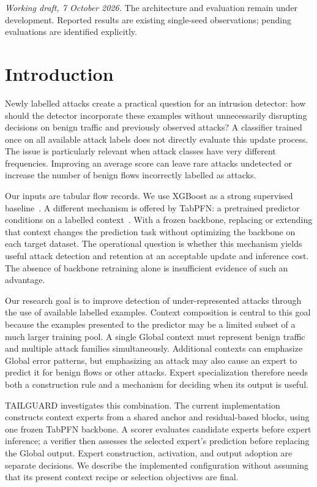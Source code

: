 \documentclass[sigconf,anonymous,pbalance]{acmart}
\begin{document}
\noindent\textit{Working draft, 7 October 2026.} The architecture and evaluation remain under development. Reported results are existing single-seed observations; pending evaluations are identified explicitly.

\section{Introduction}
\label{sec:intro}
Newly labelled attacks create a practical question for an intrusion detector: how should the detector incorporate these examples without unnecessarily disrupting decisions on benign traffic and previously observed attacks? A classifier trained once on all available attack labels does not directly evaluate this update process. The issue is particularly relevant when attack classes have very different frequencies. Improving an average score can leave rare attacks undetected or increase the number of benign flows incorrectly labelled as attacks.

Our inputs are tabular flow records. We use XGBoost as a strong supervised baseline~\cite{chen2016xgboost}. A different mechanism is offered by TabPFN: a pretrained predictor conditions on a labelled context~\cite{hollmann2023tabpfn,hollmann2025tabpfn}. With a frozen backbone, replacing or extending that context changes the prediction task without optimizing the backbone on each target dataset. The operational question is whether this mechanism yields useful attack detection and retention at an acceptable update and inference cost. The absence of backbone retraining alone is insufficient evidence of such an advantage.

Our research goal is to improve detection of under-represented attacks through the use of available labelled examples. Context composition is central to this goal because the examples presented to the predictor may be a limited subset of a much larger training pool. A single Global context must represent benign traffic and multiple attack families simultaneously. Additional contexts can emphasize Global error patterns, but emphasizing an attack may also cause an expert to predict it for benign flows or other attacks. Expert specialization therefore needs both a construction rule and a mechanism for deciding when its output is useful.

TAILGUARD investigates this combination. The current implementation constructs context experts from a shared anchor and residual-based blocks, using one frozen TabPFN backbone. A scorer evaluates candidate experts before expert inference; a verifier then assesses the selected expert's prediction before replacing the Global output. Expert construction, activation, and output adoption are separate decisions. We describe the implemented configuration without assuming that its present context recipe or selection objectives are final.
\end{document}
